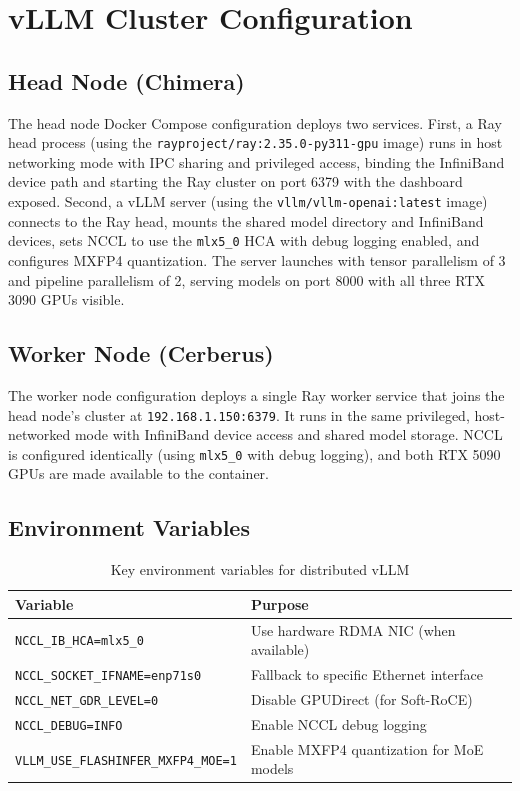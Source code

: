\documentclass[10pt,letterpaper]{article}
\begin{document}
\section{vLLM Cluster Configuration}

\subsection{Head Node (Chimera)}

The head node Docker Compose configuration deploys two services. First, a Ray head process (using the \texttt{rayproject/ray:2.35.0-py311-gpu} image) runs in host networking mode with IPC sharing and privileged access, binding the InfiniBand device path and starting the Ray cluster on port 6379 with the dashboard exposed. Second, a vLLM server (using the \texttt{vllm/vllm-openai:latest} image) connects to the Ray head, mounts the shared model directory and InfiniBand devices, sets NCCL to use the \texttt{mlx5\_0} HCA with debug logging enabled, and configures MXFP4 quantization. The server launches with tensor parallelism of 3 and pipeline parallelism of 2, serving models on port 8000 with all three RTX 3090 GPUs visible.

\subsection{Worker Node (Cerberus)}

The worker node configuration deploys a single Ray worker service that joins the head node's cluster at \texttt{192.168.1.150:6379}. It runs in the same privileged, host-networked mode with InfiniBand device access and shared model storage. NCCL is configured identically (using \texttt{mlx5\_0} with debug logging), and both RTX 5090 GPUs are made available to the container.

\subsection{Environment Variables}

\begin{table}[H]
\centering
\small
\begin{tabular}{@{}lp{8cm}@{}}
\toprule
\textbf{Variable} & \textbf{Purpose} \\
\midrule
\texttt{NCCL\_IB\_HCA=mlx5\_0} & Use hardware RDMA NIC (when available) \\
\texttt{NCCL\_SOCKET\_IFNAME=enp71s0} & Fallback to specific Ethernet interface \\
\texttt{NCCL\_NET\_GDR\_LEVEL=0} & Disable GPUDirect (for Soft-RoCE) \\
\texttt{NCCL\_DEBUG=INFO} & Enable NCCL debug logging \\
\texttt{VLLM\_USE\_FLASHINFER\_MXFP4\_MOE=1} & Enable MXFP4 quantization \cite{mxfp4-paper} for MoE models \\
\bottomrule
\end{tabular}
\caption{Key environment variables for distributed vLLM}
\end{table}
\end{document}
